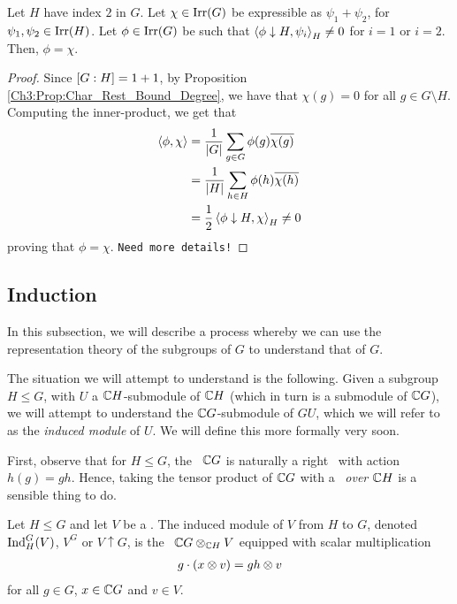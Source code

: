 \begin{proposition}
    Let $H$ have index $2$ in $G$. Let $\chi \in \operatorname{Irr}\!\left( G \right)$ be expressible as $\psi_1 + \psi_2$, for $\psi_1, \psi_2 \in \operatorname{Irr}\!\left( H \right)$. Let $\phi \in \operatorname{Irr}\!\left( G \right)$ be such that $\left\langle \phi \downarrow H, \psi_i \right\rangle_H \neq 0$ for $i=1$ or $i=2$. Then, $\phi = \chi$.
\end{proposition}
\begin{proof}
    Since $\left[ G : H \right] = 1 + 1$, by Proposition \ref{Ch3:Prop:Char_Rest_Bound_Degree}, we have that $\chi(g) = 0$ for all $g \in G \setminus H$. Computing the inner-product, we get that
    \begin{align*}
        \left\langle \phi, \chi \right\rangle &= \frac{1}{\left\lvert G \right\rvert} \sum_{g \in G} \phi(g) \overline{\chi(g)} \\
        &= \frac{1}{\left\lvert H \right\rvert} \sum_{h \in H} \phi(h) \overline{\chi(h)} \\
        &= \frac{1}{2} \left\langle \phi \downarrow H, \chi \right\rangle_H \neq 0
    \end{align*}
    proving that $\phi = \chi$. \verb|Need more details!|
\end{proof}

\subsection{Induction}

In this subsection, we will describe a process whereby we can use the representation theory of the subgroups of $G$ to understand that of $G$.

The situation we will attempt to understand is the following. Given a subgroup $H \leq G$, with $U$ a $\mathbb{C} H$-submodule of $\mathbb{C} H$ (which in turn is a submodule of $\mathbb{C} G$), we will attempt to understand the $\mathbb{C} G$-submodule of $G U$, which we will refer to as the \emph{induced module} of $U$. We will define this more formally very soon.

First, observe that for $H \leq G$, the \CGM\ $\mathbb{C} G$ is naturally a right \CHM\ with action $h(g) = gh$. Hence, taking the tensor product of $\mathbb{C} G$ with a \CHM\ \textit{over $\mathbb{C} H$} is a sensible thing to do.

\begin{boxdefinition}
    Let $H \leq G$ and let $V$ be a \CHM. The induced module of $V$ from $H$ to $G$, denoted $\operatorname{Ind}_H^G(V)$, $V^G$ or $V \uparrow G$, is the \CGM\ $\mathbb{C} G \otimes_{\mathbb{C} H} V$ equipped with scalar multiplication
    \begin{align}
        g \cdot \left( x \otimes v \right) = gh \otimes v
    \end{align}
    for all $g \in G$, $x \in \mathbb{C} G$ and $v \in V$.
\end{boxdefinition}